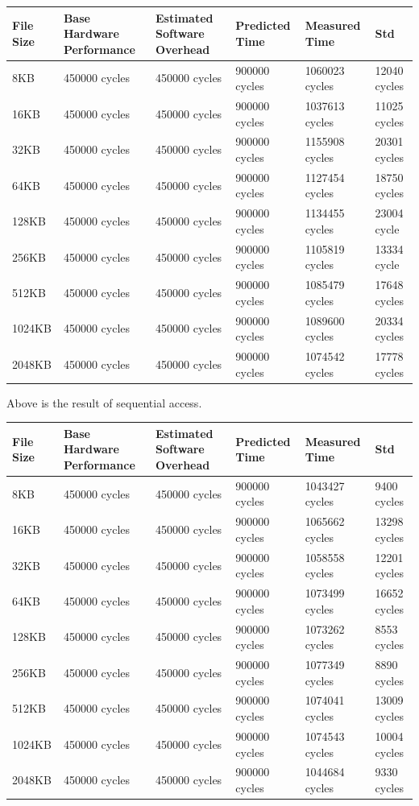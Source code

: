 \begin{center}
\begin{tabular}{| p{2cm} | p{2.5cm} | p{2.5cm} | p{2.5cm} | p{2.5cm} | p{3cm} }
File Size  & Base Hardware Performance  & Estimated Software Overhead  & Predicted Time  & Measured Time  & Std \\
\hline
8KB & 450000 cycles& 450000 cycles& 900000 cycles& 1060023 cycles & 12040 cycles \\ 
16KB & 450000 cycles& 450000 cycles& 900000 cycles& 1037613 cycles & 11025 cycles\\ 
32KB & 450000 cycles& 450000 cycles& 900000 cycles& 1155908 cycles & 20301 cycles\\
64KB & 450000 cycles& 450000 cycles& 900000 cycles& 1127454 cycles & 18750 cycles\\
128KB & 450000 cycles& 450000 cycles& 900000 cycles& 1134455 cycles & 23004 cycle \\
256KB & 450000 cycles& 450000 cycles& 900000 cycles& 1105819 cycles & 13334 cycle \\
512KB & 450000 cycles& 450000 cycles& 900000 cycles& 1085479 cycles & 17648 cycles\\
1024KB & 450000 cycles& 450000 cycles& 900000 cycles& 1089600 cycles & 20334 cycles\\
2048KB & 450000 cycles& 450000 cycles& 900000 cycles& 1074542 cycles & 17778 cycles \\

\end{tabular}
\end{center}

Above is the result of sequential access.

\begin{center}
\begin{tabular}{| p{2cm} | p{2.5cm} | p{2.5cm} | p{2.5cm} | p{2.5cm} | p{3cm} }
File Size  & Base Hardware Performance  & Estimated Software Overhead  & Predicted Time  & Measured Time  & Std \\
\hline
8KB & 450000 cycles& 450000 cycles& 900000 cycles& 1043427 cycles & 9400 cycles\\ 
16KB & 450000 cycles& 450000 cycles& 900000 cycles& 1065662 cycles & 13298 cycles\\ 
32KB & 450000 cycles& 450000 cycles& 900000 cycles& 1058558 cycles & 12201 cycles\\
64KB & 450000 cycles& 450000 cycles& 900000 cycles& 1073499 cycles & 16652 cycles\\
128KB & 450000 cycles& 450000 cycles& 900000 cycles& 1073262 cycles & 8553 cycles\\
256KB & 450000 cycles& 450000 cycles& 900000 cycles& 1077349 cycles & 8890 cycles\\
512KB & 450000 cycles& 450000 cycles& 900000 cycles& 1074041 cycles & 13009 cycles\\
1024KB & 450000 cycles& 450000 cycles& 900000 cycles& 1074543 cycles & 10004 cycles\\
2048KB & 450000 cycles& 450000 cycles& 900000 cycles& 1044684 cycles & 9330 cycles\\

\end{tabular}
\end{center}

